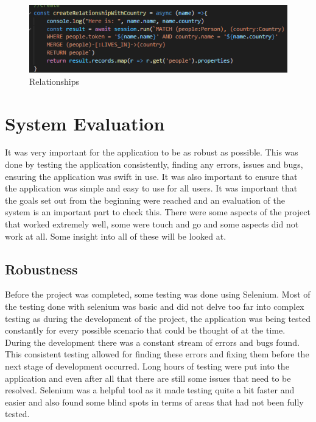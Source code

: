 \begin{figure}[H]
    \centering
    \includegraphics{img/backend8.png}
    \caption{Relationships} 
    \label{fig:my_label}
\end{figure}

\chapter{System Evaluation}

It was very important for the application to be as robust as possible. This was done by testing the application consistently, finding any errors, issues and bugs, ensuring the application was swift in use. It was also important to ensure that the application was simple and easy to use for all users. It was important that the goals set out from the beginning were reached and an evaluation of the system is an important part to check this. There were some aspects of the project that worked extremely well, some were touch and go and some aspects did not work at all. Some insight into all of these will be looked at. 

\section{Robustness}

Before the project was completed, some testing was done using Selenium. Most of the testing done with selenium was basic and did not delve too far into complex testing as during the development of the project, the application was being tested constantly for every possible scenario that could be thought of at the time. During the development there was a constant stream of errors and bugs found. This consistent testing allowed for finding these errors and fixing them before the next stage of development occurred. Long hours of testing were put into the application and even after all that there are still some issues that need to be resolved. Selenium was a helpful tool as it made testing quite a bit faster and easier and also found some blind spots in terms of areas that had not been fully tested.\\

